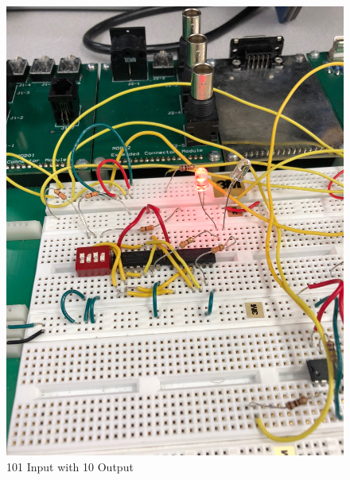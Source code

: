 \documentclass[10pt]{article}
\begin{document}
\begin{centering}
	\begin{figure} [H]
		\centering
		\includegraphics[scale=0.07]{images/101led.jpg}
		\caption{101 Input with 10 Output}
	\end{figure}
\end{centering}
\end{document}
